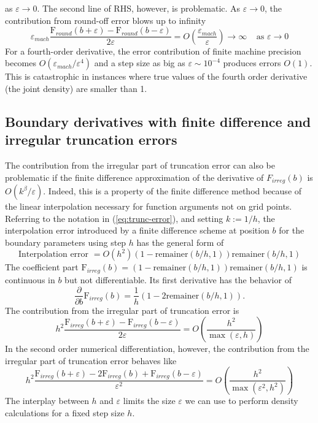 as $\varepsilon \rightarrow 0$.  The second line of RHS, however, is
problematic. As $\varepsilon \rightarrow 0$, the contribution from
round-off error blows up to infinity
\[
  \varepsilon_{mach}
  \frac{\mbox{F}_{round}(b+\varepsilon)-\mbox{F}_{round}(b-\varepsilon)}{2
    \varepsilon} = O\left(\frac{\varepsilon_{mach}}{\varepsilon}
  \right) \longrightarrow \infty \;\;\;\; \mbox{as } \varepsilon
  \rightarrow 0
\]
For a fourth-order derivative, the error contribution of finite
machine precision becomes $O(\varepsilon_{mach}/\varepsilon^4)$ and a
step size as big as $\varepsilon \sim 10^{-4}$ produces errors
$O(1)$. This is catastrophic in instances where true values of the
fourth order derivative (the joint density) are smaller than 1.

\subsection{Boundary derivatives with finite difference and irregular truncation errors}
The contribution from the irregular part of truncation error can also
be problematic if the finite difference approximation of the
derivative of $F_{irreg}(b)$ is $O(k^\beta/\varepsilon)$. Indeed, this
is a property of the finite difference method because of the linear
interpolation necessary for function arguments not on grid
points. Referring to the notation in (\ref{eq:trunc-error}), and
setting $k := 1/h$, the interpolation error introduced by a finite
difference scheme at position $b$ for the boundary parameters using
step $h$ has the general form of
$$\mbox{Interpolation error } = O(h^2) (1-\mbox{remainer}(b/h,1)) \mbox{remainer}(b/h,1)$$
The coefficient part
$\mbox{F}_{irreg}(b) = (1-\mbox{remainer}(b/h,1)) \mbox{remainer}(b/h,1) $ is
continuous in $b$ but not differentiable. Its first derivative has the
behavior of
$$ \frac{\partial }{\partial b} \mbox{F}_{irreg}(b) =  \frac{1}{h} \left(1-2\mbox{remainer}(b/h,1) \right).$$ The contribution from the irregular part of truncation error is
$$ h^2 \frac{\mbox{F}_{irreg}(b+\varepsilon)-\mbox{F}_{irreg}(b-\varepsilon)}{2 \varepsilon}  =
O\left(\frac{h^2}{\max(\varepsilon, h)} \right) $$
In the second order numerical differentiation, however, the contribution from
the irregular part of truncation error behaves like
$$ h^2 \frac{\mbox{F}_{irreg}(b+\varepsilon)-2\mbox{F}_{irreg}(b)
  +\mbox{F}_{irreg}(b-\varepsilon)}{\varepsilon^2 } =
O\left(\frac{h^2}{\max(\varepsilon^2, h^2)} \right) $$ The interplay
between $h$ and $\varepsilon$ limits the size $\varepsilon$ we can use
to perform density calculations for a fixed step size $h$.

